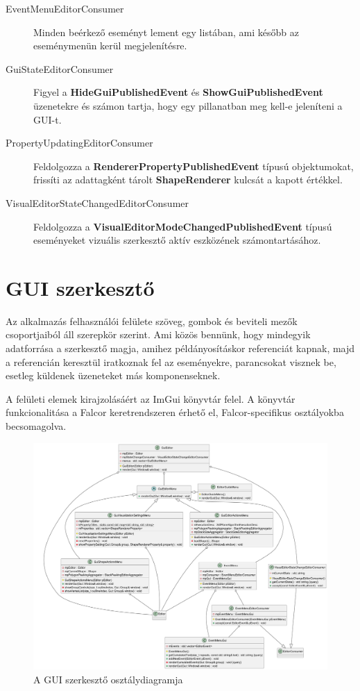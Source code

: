 \begin{description}
	\item[EventMenuEditorConsumer] Minden beérkező eseményt lement egy listában, ami később az eseménymenün kerül megjelenítésre.
	\item[GuiStateEditorConsumer] Figyel a \textbf{HideGuiPublishedEvent} és \textbf{ShowGuiPublishedEvent} üzenetekre és számon tartja, hogy egy pillanatban meg kell-e jeleníteni a GUI-t.
	\item[PropertyUpdatingEditorConsumer] Feldolgozza a \textbf{RendererPropertyPublishedEvent} típusú objektumokat, frissíti az adattagként tárolt \textbf{ShapeRenderer} kulcsát a kapott értékkel.
	\item[VisualEditorStateChangedEditorConsumer] Feldolgozza a \textbf{VisualEditorModeChangedPublishedEvent} típusú eseményeket vizuális szerkesztő aktív eszközének számontartásához.
\end{description}


\section{GUI szerkesztő}

Az alkalmazás felhasználói felülete szöveg, gombok és beviteli mezők csoportjaiból áll szerepkör szerint. Ami közös bennünk, hogy mindegyik adatforrása a szerkesztő magja, amihez példányosításkor referenciát kapnak, majd a referencián keresztül iratkoznak fel az eseményekre, parancsokat visznek be, esetleg küldenek üzeneteket más komponenseknek.

A felületi elemek kirajzolásáért az ImGui könyvtár\cite{imgui} felel. A könyvtár funkcionalitása a Falcor keretrendszeren érhető el, Falcor-specifikus osztályokba becsomagolva.


\begin{figure}[H]
	\centering
	\includegraphics[width=1\linewidth]{images/class_gui_editor.png}
	\caption{A GUI szerkesztő osztálydiagramja}
	\label{fig:class_gui_editor-1}
\end{figure}

